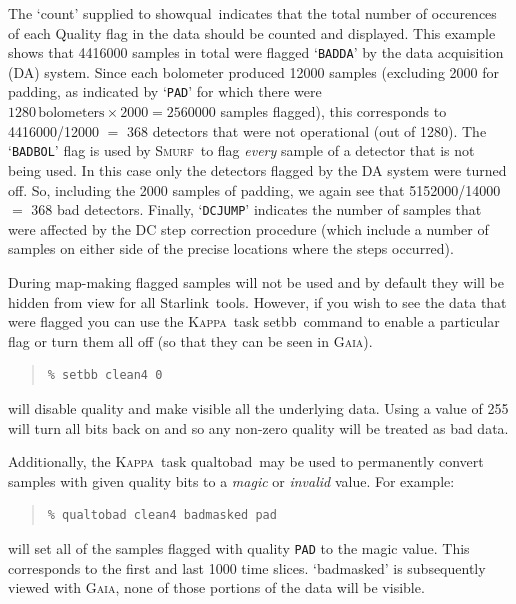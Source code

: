 \documentclass[twoside,11pt]{article}
\newcommand{\htmladdnormallink}[2]{#1}
\newcommand{\xref}[3]{#1}
\renewcommand{\_}{\texttt{\symbol{95}}}
\newenvironment{myquote}{\begin{quote}\begin{small}}{\end{small}\end{quote}}
\newcommand{\starlink}{\htmladdnormallink{Starlink}{http://starlink.jach.hawaii.edu}}
\newcommand{\Kappa}{\xref{\textsc{Kappa}}{sun95}{}}
\newcommand{\gaia}{\xref{\textsc{Gaia}}{sun214}{}}
\newcommand{\smurf}{\xref{\textsc{Smurf}}{sun258}{}}
\newcommand{\task}[1]{\textsf{#1}}
\newcommand{\qualtobad}{\xref{\task{qualtobad}}{sun95}{QUALTOBAD}}
\newcommand{\showqual}{\xref{\task{showqual}}{sun95}{SHOWQUAL}}
\newcommand{\setbb}{\xref{\task{setbb}}{sun95}{SETBB}}
\begin{document}
The `count' supplied to \showqual\ indicates that the total number of
occurences of each Quality flag in the data should be counted and
displayed.  This example shows that 4416000 samples in total were
flagged `\texttt{BADDA}' by the data acquisition (DA) system. Since
each bolometer produced 12000 samples (excluding 2000 for padding, as
indicated by `\texttt{PAD}' for which there were $1280
\,\mathrm{bolometers} \times 2000 = 2560000$ samples flagged), this
corresponds to 4416000/12000 $=$ 368 detectors that were not
operational (out of 1280). The `\texttt{BADBOL}' flag is used by
\smurf\ to flag {\em every} sample of a detector that is not being
used. In this case only the detectors flagged by the DA system were
turned off. So, including the 2000 samples of padding, we again see
that 5152000/14000 $=$ 368 bad detectors. Finally, `\texttt{DCJUMP}'
indicates the number of samples that were affected by the DC step
correction procedure (which include a number of samples on either side
of the precise locations where the steps occurred).


During map-making flagged samples will not be used and by default they
will be hidden from view for all \starlink\ tools. However, if you
wish to see the data that were flagged you can use the \Kappa\ task
\setbb\ command to enable a particular flag or turn them all off (so
that they can be seen in \gaia).

\begin{myquote}
\begin{verbatim}
% setbb clean4 0
\end{verbatim}
\end{myquote}

will disable quality and make visible all the underlying data. Using a
value of 255 will turn all bits back on and so any non-zero quality will be
treated as bad data.

Additionally, the \Kappa\ task \qualtobad\ may be used to
permanently convert samples with given quality bits to a {\em magic\/} or {\em
  invalid\/} value. For example:

\begin{myquote}
\begin{verbatim}
% qualtobad clean4 badmasked pad
\end{verbatim}
\end{myquote}
%
will set all of the samples flagged with quality \texttt{PAD} to the
magic value. This corresponds to the first and last 1000 time
slices. `badmasked' is subsequently viewed with \gaia, none of those portions
of the data will be visible.
\end{document}
